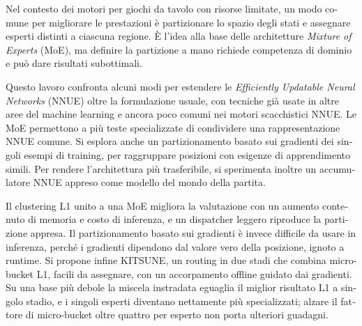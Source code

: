 
\begin{otherlanguage}{italian}
Nel contesto dei motori per giochi da tavolo con risorse limitate, un modo comune per migliorare le prestazioni è partizionare lo spazio degli stati e assegnare esperti distinti a ciascuna regione. È l'idea alla base delle architetture \emph{Mixture of Experts} (MoE), ma definire la partizione a mano richiede competenza di dominio e può dare risultati subottimali.

Questo lavoro confronta alcuni modi per estendere le \emph{Efficiently Updatable Neural Networks} (NNUE) oltre la formulazione usuale, con tecniche già usate in altre aree del machine learning e ancora poco comuni nei motori scacchistici NNUE. Le MoE permettono a più teste specializzate di condividere una rappresentazione NNUE comune. Si esplora anche un partizionamento basato sui gradienti dei singoli esempi di training, per raggruppare posizioni con esigenze di apprendimento simili. Per rendere l'architettura più trasferibile, si sperimenta inoltre un accumulatore NNUE appreso come modello del mondo della partita.

Il clustering L1 unito a una MoE migliora la valutazione con un aumento contenuto di memoria e costo di inferenza, e un dispatcher leggero riproduce la partizione appresa. Il partizionamento basato sui gradienti è invece difficile da usare in inferenza, perché i gradienti dipendono dal valore vero della posizione, ignoto a runtime. Si propone infine KITSUNE, un routing in due stadi che combina micro-bucket L1, facili da assegnare, con un accorpamento offline guidato dai gradienti. Su una base più debole la miscela instradata eguaglia il miglior risultato L1 a singolo stadio, e i singoli esperti diventano nettamente più specializzati; alzare il fattore di micro-bucket oltre quattro per esperto non porta ulteriori guadagni.
\end{otherlanguage}
